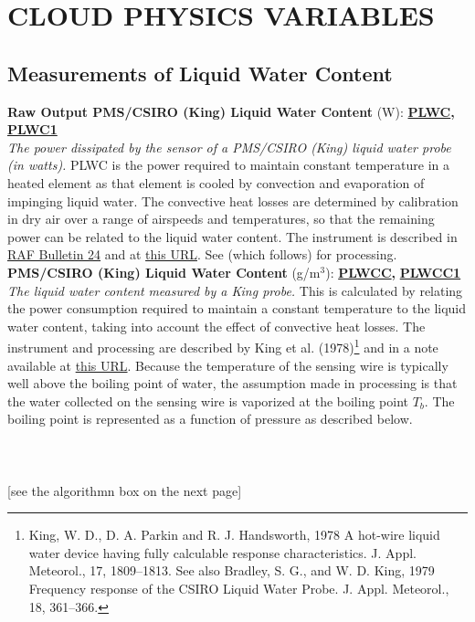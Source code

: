 
\section{CLOUD PHYSICS VARIABLES}

\subsection{Measurements of Liquid Water Content}
\begin{hangparagraphs}
\textbf{Raw Output PMS/CSIRO (King) Liquid Water Content} (W):\textbf{
}\textbf{\uline{PLWC}}\textbf{,
}\textbf{\uline{PLWC1}}\label{punch:5-3}\\
\emph{The power dissipated by the sensor of a PMS/CSIRO
(King) liquid water probe (in watts).
}PLWC is the power required to maintain constant temperature in a
heated element as that element is cooled by convection and evaporation
of impinging liquid water. The convective heat losses are determined
by calibration in dry air over a range of airspeeds and temperatures,
so that the remaining power can be related to the liquid water content.
The instrument is described in \href{http://www.eol.ucar.edu/raf/Bulletins/bulletin24.html}{RAF Bulletin 24}
and at \href{http://www.eol.ucar.edu/instruments/king-csiro-liquid-water-sensor}{this URL}.
See  (which follows) for processing.\\

\textbf{\label{PLWCC}PMS/CSIRO (King) Liquid Water Content} (g/m$^{3}$):\textbf{
}\textbf{\uline{PLWCC}}\textbf{,
}\textbf{\uline{PLWCC1}}\\
\emph{The liquid water content}
\emph{measured by a King probe.} This is calculated by relating the
power consumption required to maintain a constant temperature to the
liquid water content, taking into account the effect of convective
heat losses. The instrument and processing are described by King et
al. (1978)\footnote{King, W. D., D. A. Parkin and R. J. Handsworth, 1978 A hot-wire liquid
water device having fully calculable response characteristics. J.
Appl. Meteorol., 17, 1809--1813. See also Bradley, S. G., and W.
D. King, 1979 Frequency response of the CSIRO Liquid Water Probe.
J. Appl. Meteorol., 18, 361--366.} and in a note available at \href{https://www.eol.ucar.edu/system/files/PLWCCrev140214.pdf}{this URL}.
Because the temperature of the sensing wire is typically well above
the boiling point of water, the assumption
made in processing is that the water collected on the sensing wire
is vaporized at the boiling point $T_{b}$. The boiling point is represented
as a function of pressure as described below. \\
\\
\\
\\
{[}see the algorithmn box on the next page{]}\\
\vfill


\end{hangparagraphs}

